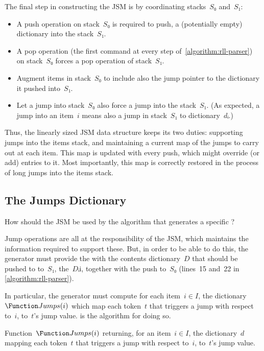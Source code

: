The final step in constructing the JSM is by coordinating
stacks~$S₀$ and~$S₁$:
\begin{itemize}
  \item A push operation on stack~$S₀$ is required to push, a (potentially
        empty) dictionary into the stack~$S₁$.
  \item A pop operation (the first command at every step of~\cref{algorithm:rll-parser})
        on stack~$S₀$ forces a pop operation of stack~$S₁$.
  \item Augment items in stack~$S₀$ to include also the jump pointer to
        the dictionary it pushed into~$S₁$.
  \item Let a jump into stack~$S₀$ also
        force a jump into the stack~$S₁$.
        (As expected, a jump into an item~$i$ means also a jump
        in stack~$S₁$ to dictionary~$dᵢ$.)
\end{itemize}
Thus, the linearly sized JSM data structure keeps its two
duties: supporting jumps into the items stack,
and maintaining a current map of the jumps to carry out at each item.
This map is updated with every push, which might
override (or add) entries to it.
Most importantly, this map is correctly restored
in the process of long jumps into the items stack.

\subsection{The Jumps Dictionary}
How should the JSM be used by the algorithm that generates
a specific \RLLp?

Jump operations are all at the responsibility of the JSM,
which maintains the information required to support these.
But, in order to be able to do this, the generator must
provide the \RLLp with the contents dictionary~$D$ that should be pushed to
to~$S₁$, the~$Dᵢ$i, together with the push to~$S₀$ (lines~15 and~22 in
\cref{algorithm:rll-parser}).

In particular, the \RLLp generator must compute for each
item~$i∈I$, the dictionary~$\Function Jumps(i)$ which
map each token~$t$ that triggers a jump with
respect to~$i$, to~$t$'s jump value.
 is the algorithm for doing so.

\begin{algorithm}
  \begin{algorithmic}
  \caption{\label{algorithm:coordination}
    Function~$\Function Jumps(i)$ returning, for an item~$i∈I$,
  the dictionary~$d$ mapping each token~$t$ that
    triggers a jump with respect to~$i$, to~$t$'s jump value.
  }
   
   
      \BREAK
    \FI
       
      \FI
    \ENDFOR
  \ENDFOR
  \end{algorithmic}
\end{algorithm}

